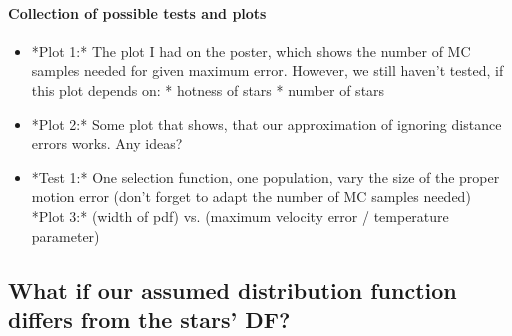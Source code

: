 \documentclass[12pt,preprint]{aastex}
\begin{document}
\paragraph{Collection of possible tests and plots}

\begin{itemize}
\item *Plot 1:* The plot I had on the poster, which shows the number of MC samples needed for given maximum error. However, we still haven't tested, if this plot depends on: 
    * hotness of stars
    * number of stars
\item *Plot 2:* Some plot that shows, that our approximation of ignoring distance errors works. Any ideas?
\item *Test 1:* One selection function, one population, vary the size of the proper motion error (don't forget to adapt the number of MC samples needed) \\
*Plot 3:* (width of pdf) vs. (maximum velocity error / temperature parameter)
\end{itemize}

\subsection{What if our assumed distribution function differs from the stars' DF?}
\end{document}
